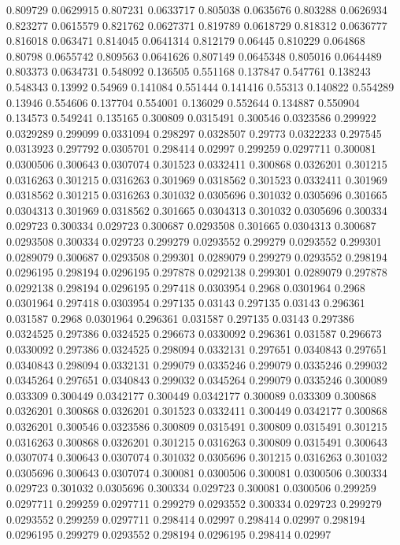 0.809729 0.0629915
0.807231 0.0633717
0.805038 0.0635676
0.803288 0.0626934
0.823277 0.0615579
0.821762 0.0627371
0.819789 0.0618729
0.818312 0.0636777
0.816018 0.063471
0.814045 0.0641314
0.812179 0.06445
0.810229 0.064868
0.80798 0.0655742
0.809563 0.0641626
0.807149 0.0645348
0.805016 0.0644489
0.803373 0.0634731
0.548092 0.136505
0.551168 0.137847
0.547761 0.138243
0.548343 0.13992
0.54969 0.141084
0.551444 0.141416
0.55313 0.140822
0.554289 0.13946
0.554606 0.137704
0.554001 0.136029
0.552644 0.134887
0.550904 0.134573
0.549241 0.135165
0.300809 0.0315491
0.300546 0.0323586
0.299922 0.0329289
0.299099 0.0331094
0.298297 0.0328507
0.29773 0.0322233
0.297545 0.0313923
0.297792 0.0305701
0.298414 0.02997
0.299259 0.0297711
0.300081 0.0300506
0.300643 0.0307074
0.301523 0.0332411
0.300868 0.0326201
0.301215 0.0316263
0.301215 0.0316263
0.301969 0.0318562
0.301523 0.0332411
0.301969 0.0318562
0.301215 0.0316263
0.301032 0.0305696
0.301032 0.0305696
0.301665 0.0304313
0.301969 0.0318562
0.301665 0.0304313
0.301032 0.0305696
0.300334 0.029723
0.300334 0.029723
0.300687 0.0293508
0.301665 0.0304313
0.300687 0.0293508
0.300334 0.029723
0.299279 0.0293552
0.299279 0.0293552
0.299301 0.0289079
0.300687 0.0293508
0.299301 0.0289079
0.299279 0.0293552
0.298194 0.0296195
0.298194 0.0296195
0.297878 0.0292138
0.299301 0.0289079
0.297878 0.0292138
0.298194 0.0296195
0.297418 0.0303954
0.2968 0.0301964
0.2968 0.0301964
0.297418 0.0303954
0.297135 0.03143
0.297135 0.03143
0.296361 0.031587
0.2968 0.0301964
0.296361 0.031587
0.297135 0.03143
0.297386 0.0324525
0.297386 0.0324525
0.296673 0.0330092
0.296361 0.031587
0.296673 0.0330092
0.297386 0.0324525
0.298094 0.0332131
0.297651 0.0340843
0.297651 0.0340843
0.298094 0.0332131
0.299079 0.0335246
0.299079 0.0335246
0.299032 0.0345264
0.297651 0.0340843
0.299032 0.0345264
0.299079 0.0335246
0.300089 0.033309
0.300449 0.0342177
0.300449 0.0342177
0.300089 0.033309
0.300868 0.0326201
0.300868 0.0326201
0.301523 0.0332411
0.300449 0.0342177
0.300868 0.0326201
0.300546 0.0323586
0.300809 0.0315491
0.300809 0.0315491
0.301215 0.0316263
0.300868 0.0326201
0.301215 0.0316263
0.300809 0.0315491
0.300643 0.0307074
0.300643 0.0307074
0.301032 0.0305696
0.301215 0.0316263
0.301032 0.0305696
0.300643 0.0307074
0.300081 0.0300506
0.300081 0.0300506
0.300334 0.029723
0.301032 0.0305696
0.300334 0.029723
0.300081 0.0300506
0.299259 0.0297711
0.299259 0.0297711
0.299279 0.0293552
0.300334 0.029723
0.299279 0.0293552
0.299259 0.0297711
0.298414 0.02997
0.298414 0.02997
0.298194 0.0296195
0.299279 0.0293552
0.298194 0.0296195
0.298414 0.02997
